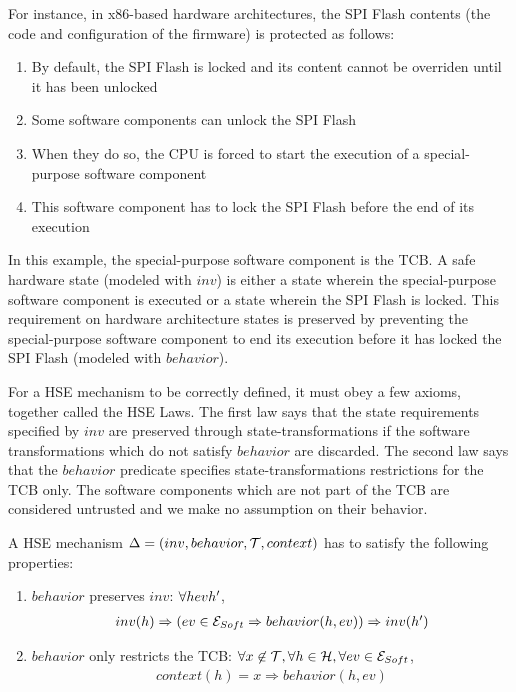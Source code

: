   For instance, in x86-based hardware architectures, the SPI Flash contents (the
  code and configuration of the firmware) is protected as follows:

  \begin{enumerate}
  \item By default, the SPI Flash is locked and its content cannot be overriden
    until it has been unlocked
  \item Some software components can unlock the SPI Flash
  \item When they do so, the CPU is forced to start the execution of a
    special-purpose software component
  \item This software component has to lock the SPI Flash before the end of its
    execution
  \end{enumerate}
  In this example, the special-purpose software component is the TCB. A safe
  hardware state (modeled with $inv$) is either a state wherein the
  special-purpose software component is executed or a state wherein the SPI
  Flash is locked. This requirement on hardware architecture states is preserved
  by preventing the special-purpose software component to end its execution
  before it has locked the SPI Flash (modeled with $behavior$).

  For a HSE mechanism to be correctly defined, it must obey a few axioms,
  together called the HSE Laws. The first law says that the state requirements
  specified by $inv$ are preserved through state-transformations if the software
  transformations which do not satisfy $behavior$ are discarded. The second law
  says that the $behavior$ predicate specifies state-transformations
  restrictions for the TCB only. The software components which are not part of
  the TCB are considered untrusted and we make no assumption on their behavior.

  \begin{definition}
    \label{def:laws}
    A HSE mechanism $\Delta = (inv, behavior, \mathcal{T}, context)$ has to satisfy
    the following properties:
    \begin{enumerate}
    \item $behavior$ preserves $inv$: $\forall \transitionLTS{Ez}{h}{ev}{h'}$,
      \[ \begin{array}{l} inv(h) \Rightarrow (ev \in \mathcal{E}_{Soft} \Rightarrow
          behavior(h,ev)) \Rightarrow inv(h')
         \end{array}
       \]
     \item $behavior$ only restricts the TCB:
       $\forall x \not\in \mathcal{T}, \forall h \in \mathcal{H}, \forall ev \in
       \mathcal{E}_{Soft}$,
       \[
         \begin{array}{l}
           context(h) = x \Rightarrow behavior(h, ev)
         \end{array}
       \]
     \end{enumerate}
   \end{definition}

